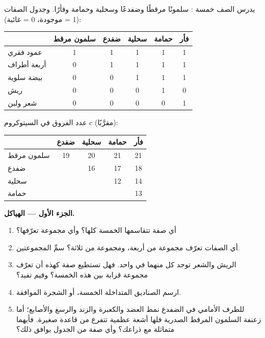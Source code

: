\begin{problem}
\label{pb:g10:common-ancestry:1}
يدرس الصف خمسة : سلمونًا مرقطًا وضفدعًا وسحلية وحمامة وفأرًا.
وجدول الصفات (1 = موجودة، 0 = غائبة):

\begin{center}
\begin{tabular}{lccccc}
 & سلمون مرقط & ضفدع & سحلية & حمامة & فأر \\ \hline
عمود فقري & 1 & 1 & 1 & 1 & 1 \\
أربعة أطراف & 0 & 1 & 1 & 1 & 1 \\
بيضة سلوية & 0 & 0 & 1 & 1 & 1 \\
ريش & 0 & 0 & 0 & 1 & 0 \\
شعر ولبن & 0 & 0 & 0 & 0 & 1 \\
\end{tabular}
\end{center}

عدد الفروق في السيتوكروم c (مقرَّبًا):

\begin{center}
\begin{tabular}{lcccc}
 & ضفدع & سحلية & حمامة & فأر \\ \hline
سلمون مرقط & 19 & 20 & 21 & 21 \\
ضفدع & & 16 & 17 & 18 \\
سحلية & & & 12 & 14 \\
حمامة & & & & 13 \\
\end{tabular}
\end{center}

\medskip
\noindent\textbf{الجزء الأول --- الهياكل.}
\begin{enumerate}
  \item أي صفة تتقاسمها الخمسة كلها؟ وأي مجموعة تعرّفها؟
  \item أي الصفات تعرّف مجموعة من أربعة، ومجموعة من ثلاثة؟ سمِّ
        المجموعتين.
  \item الريش والشعر توجد كل منهما في  واحد. فهل تستطيع صفة كهذه
        أن تعرّف مجموعة قرابة بين هذه الخمسة؟ وفيم تفيد؟
  \item ارسم الصناديق المتداخلة  الخمسة، أو الشجرة الموافقة.
  \item للطرف الأمامي في الضفدع نمط العضد والكعبرة والزند والرسغ
        والأصابع؛ أما زعنفة السلمون المرقط الصدرية فلها أشعة عظمية
        تتفرع من قاعدة صغيرة. فأيهما متماثلة مع ذراعك؟ وأي صفة من
        الجدول يوافق ذلك؟
\end{enumerate}


\end{problem}

